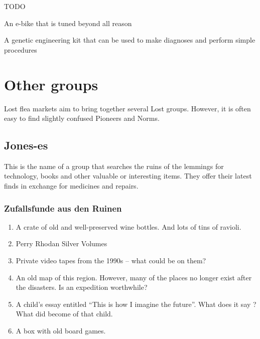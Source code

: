 \begin{npcBox}[title=Flash]
    \begin{consequences}
    \item {}
    \item {}
    \item {}
    \end{consequences}

    \begin{npcDescription}
    TODO
    \end{npcDescription}


    \begin{equipment}
    \item An e-bike that is tuned beyond all reason
    \item A genetic engineering kit that can be used to make diagnoses and perform simple procedures
    \end{equipment}
\end{npcBox}
\newpage

\chapter{Other groups}

Lost flea markets aim to bring together several Lost groups. However, it is often easy to find slightly confused Pioneers and Norms.

\section{Jones-es}

This is the name of a group that searches the ruins of the lemmings for technology, books and other valuable or interesting items. They offer their latest finds in exchange for medicines and repairs.

\subsection{Zufallsfunde aus den Ruinen}

\begin{enumerate}
    \item A crate of old and well-preserved wine bottles. And lots of tins of ravioli.
    \item Perry Rhodan Silver Volumes
    \item Private video tapes from the 1990s – what could be on them?
    \item An old map of this region. However, many of the places no longer exist after the disasters. Is an expedition worthwhile?
    \item A child's essay entitled “This is how I imagine the future”. What does it say ? What did become of that child.
    \item A box with old board games.
\end{enumerate}


